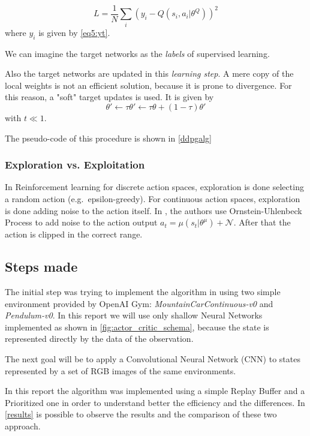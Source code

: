 \documentclass[a4paper, 11pt]{article}
\begin{document}
	\begin{equation}\label{eq9:loss}
	L = \frac{1}{N} \sum_i(y_i -Q(s_i, a_i|\theta^Q))^2
	\end{equation}\label{eq10:gradient}
	where $y_i$ is given by \vref{eq5:yt}.
	
	We can imagine the target networks as the \textit{labels} of supervised learning.
	
	Also the target networks are updated in this \textit{learning step}. A mere copy of the local weights is not an efficient solution, because it is prone to divergence. For this reason, a "soft" target updates is used. It is given by \[\theta' \leftarrow \tau\theta' \leftarrow \tau \theta + (1-\tau)\theta'\] with $t \ll 1$.
	
	The pseudo-code of this procedure is shown in \vref{ddpgalg}
	
	\subsubsection{Exploration vs. Exploitation} 
	In Reinforcement learning for discrete action spaces, exploration is done selecting a random action (e.g.\ epsilon-greedy). For continuous action spaces, exploration is done adding noise to the action itself. In \cite{lillicrap2015continuous}, the authors use Ornstein-Uhlenbeck Process \cite{uhlenbeck1930theory} to add noise to the action output $
	a_t = \mu(s_t|\theta^\mu) + \mathcal{N}$. After that the action is clipped in the correct range.
	 
	\subsection{Steps made}
	The initial step was trying to implement the algorithm in \cite{lillicrap2015continuous} using two simple environment provided by OpenAI Gym: \textit{MountainCarContinuous-v0} and \textit{Pendulum-v0}. In this report we will use only shallow Neural Networks implemented as shown in \vref{fig:actor_critic_schema}, because the state is represented directly by the data of the observation.
	
	The next goal will be to apply a Convolutional Neural Network (CNN) to states represented by a set of RGB images of the same environments.
	
	In this report the algorithm was implemented using a simple Replay Buffer and a Prioritized one in order to understand better the efficiency and the differences. In \vref{results} is possible to observe the results and the comparison of these two approach.
	
\end{document}
